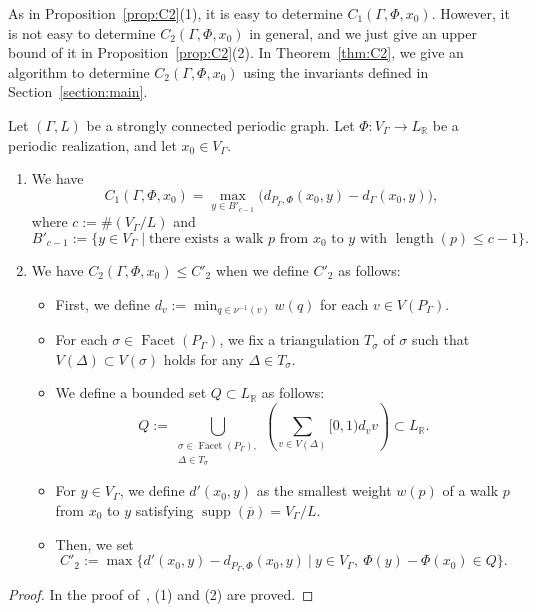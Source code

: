 \begin{rmk}
As in Proposition~\ref{prop:C2}(1), it is easy to determine $C_{1}(\Gamma, \Phi, x_0)$. 
However, it is not easy to determine $C_{2}(\Gamma, \Phi, x_0)$ in general, and we just give an upper bound of it in Proposition~\ref{prop:C2}(2). 
In Theorem~\ref{thm:C2}, we give an algorithm to determine $C_{2}(\Gamma, \Phi, x_0)$ using the invariants defined in Section~\ref{section:main}. 
\end{rmk}

\begin{prop}[{cf.\ \cite[Theorem A.2]{IN}}]\label{prop:C2}
Let $(\Gamma , L)$ be a strongly connected periodic graph. 
Let $\Phi : V_{\Gamma} \to L_{\mathbb{R}}$ be a periodic realization, and let $x_0 \in V_{\Gamma}$. 
\begin{enumerate}
\item 
We have 
\[
C_{1}(\Gamma, \Phi, x_0) = 
\max _{y \in B'_{c-1}} \bigl( d_{P_{\Gamma}, \Phi} (x_0, y) - d_{\Gamma} (x_0, y) \bigr), 
\]
where $c := \# (V_{\Gamma} /L)$ and 
\[
B'_{c-1} := \{ y \in V_{\Gamma} \mid \text{there exists a walk $p$ from $x_0$ to $y$ with $\operatorname{length}(p) \le c-1$}\}. 
\]


\item 
We have $C_{2}(\Gamma, \Phi, x_0) \le C'_2$ when we define $C'_2$ as follows: 
\begin{itemize}
\item 
First, we define $d_v := \min _{q \in \nu ^{-1}(v)} w(q)$ for each $v \in V(P_{\Gamma})$. 

\item
For each $\sigma \in \operatorname{Facet}(P_{\Gamma})$, we fix a triangulation $T_{\sigma}$ of $\sigma$ such that $V(\Delta) \subset V(\sigma)$ holds for any $\Delta \in T_{\sigma}$. 

\item
We define a bounded set $Q \subset L_{\mathbb{R}}$ as follows: 
\[
Q := 
\bigcup _{\substack{\sigma \in \operatorname{Facet}(P_{\Gamma}),\\ 
\Delta \in T_{\sigma}}}
\left( \sum _{v \in V(\Delta)}  [0,1) d_v v \right)
\subset L_{\mathbb{R}}. 
\]

\item
For $y \in V_{\Gamma}$, we define $d'(x_0, y)$ as the smallest weight $w(p)$ of 
a walk $p$ from $x_0$ to $y$ satisfying $\operatorname{supp}(\overline{p}) = V_{\Gamma} /L$. 

\item
Then, we set
\[
C' _2 := \max \bigl \{ d'(x_0, y) - d_{P_{\Gamma}, \Phi} ( x_0, y ) \ \big | \ 
y \in V_{\Gamma}, \ \Phi(y) - \Phi(x_0) \in Q \bigr \}. 
\]
\end{itemize}

\end{enumerate}
\end{prop}
\begin{proof}
In the proof of~\cite[Theorem A.2]{IN}, (1) and (2) are proved. 
\end{proof}



